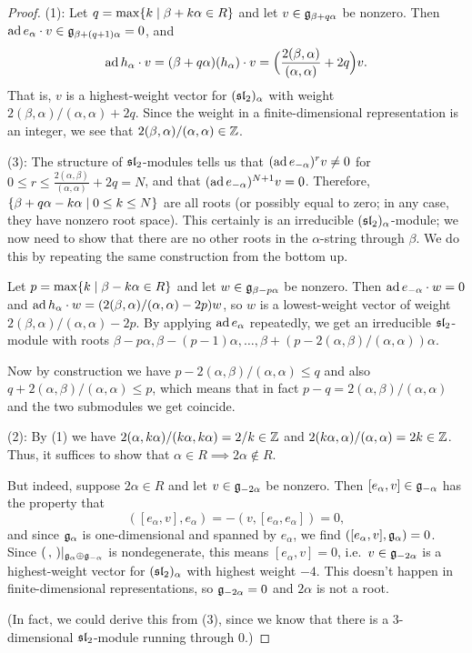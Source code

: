 \begin{proof}
(1): Let $q = \max\setc{k}{\beta + k\alpha \in R}$ and let
$v \in \g_{\beta + q\alpha}$ be nonzero. Then
$\ad e_\alpha \cdot v \in \g_{\beta + (q+1)\alpha} = 0$, and
\[
  \ad h_\alpha \cdot v = (\beta + q\alpha)(h_\alpha) \cdot v
    = \Bigl(\frac{2(\beta, \alpha)}{(\alpha, \alpha)} + 2q\Bigr)v.
\]
That is, $v$ is a highest-weight vector for $(\sl_2)_\alpha$ with weight
$2(\beta, \alpha)/(\alpha, \alpha) + 2q$. Since the weight in a
finite-dimensional representation is an integer, we see that
$2(\beta, \alpha)/(\alpha, \alpha) \in \Z$.

(3): The structure of $\sl_2$-modules tells us that
$(\ad e_{-\alpha})^rv \neq 0$ for
$0 \leq r \leq \frac{2(\alpha, \beta)}{(\alpha, \alpha)} + 2q = N$, and that
$(\ad e_{-\alpha})^{N+1}v = 0$. Therefore,
$\setc{\beta + q\alpha - k\alpha}{0 \leq k \leq N}$ are all roots (or possibly
equal to zero; in any case, they have nonzero root space). This certainly is
an irreducible $(\sl_2)_\alpha$-module; we now need to show that there are no
other roots in the $\alpha$-string through $\beta$. We do this by repeating the
same construction from the bottom up.

Let $p = \max\setc{k}{\beta - k\alpha \in R}$ and let
$w \in \g_{\beta - p\alpha}$ be nonzero. Then $\ad e_{-\alpha} \cdot w = 0$ and
$\ad h_\alpha \cdot w = (2(\beta, \alpha)/(\alpha, \alpha) - 2p)w$, so $w$ is a
lowest-weight vector of weight $2(\beta, \alpha)/(\alpha, \alpha) - 2p$. By
applying $\ad e_\alpha$ repeatedly, we get an irreducible $\sl_2$-module with
roots $\beta - p\alpha, \beta - (p - 1)\alpha, \dots,
\beta + (p - 2(\alpha, \beta)/(\alpha, \alpha))\alpha$.

Now by construction we have $p - 2(\alpha, \beta)/(\alpha, \alpha) \leq q$ and
also $q + 2(\alpha, \beta)/(\alpha, \alpha) \leq p$, which means that in fact
$p - q = 2(\alpha, \beta)/(\alpha, \alpha)$ and the two submodules we get
coincide.

(2): By (1) we have $2(\alpha, k\alpha)/(k\alpha, k\alpha) = 2/k \in \Z$ and
$2(k\alpha, \alpha)/(\alpha, \alpha) = 2k \in \Z$. Thus, it suffices to show
that $\alpha \in R \implies 2\alpha \notin R$.

But indeed, suppose $2\alpha \in R$ and let $v \in \g_{-2\alpha}$ be nonzero.
Then $[e_\alpha, v] \in \g_{-\alpha}$ has the property that
\[
  ([e_\alpha, v], e_\alpha) = -(v, [e_\alpha, e_\alpha]) = 0,
\]
and since $\g_\alpha$ is one-dimensional and spanned by $e_\alpha$, we find
$([e_\alpha, v], \g_\alpha) = 0$. Since
$(\,,\,)|_{\g_\alpha \oplus \g_{-\alpha}}$ is nondegenerate, this means
$[e_\alpha, v] = 0$, i.e.\ $v \in \g_{-2\alpha}$ is a highest-weight vector
for $(\sl_2)_\alpha$ with highest weight $-4$. This doesn't happen in
finite-dimensional representations, so $\g_{-2\alpha} = 0$ and $2\alpha$ is not
a root.

(In fact, we could derive this from (3), since we know that there is a
$3$-dimensional $\sl_2$-module running through $0$.)
\end{proof}

